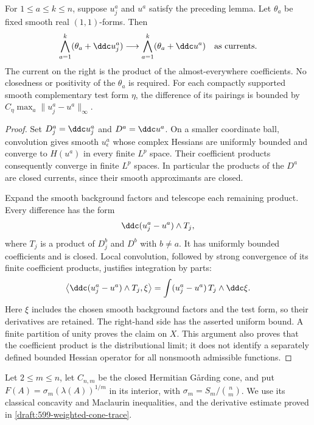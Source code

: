 \begin{lemma}\label{draft:603-complex-hessian-products}
For $1\leq a\leq k\leq n$, suppose $u_j^a$ and $u^a$ satisfy the preceding
lemma. Let $\theta_a$ be fixed smooth real $(1,1)$-forms. Then
\[
 \bigwedge_{a=1}^k(\theta_a+\ddc u_j^a)
       \longrightarrow
 \bigwedge_{a=1}^k(\theta_a+\ddc u^a)
       \quad\hbox{as currents}.
\]
The current on the right is the product of the almost-everywhere
coefficients. No closedness or positivity of the $\theta_a$ is required.
For each compactly supported smooth complementary test form $\eta$, the
difference of its pairings is bounded by
$C_\eta\max_a\|u_j^a-u^a\|_\infty$.
\end{lemma}
\begin{proof}
Set $D_j^a=\ddc u_j^a$ and $D^a=\ddc u^a$.
On a smaller coordinate ball, convolution gives smooth $u_\epsilon^a$
whose complex Hessians are uniformly bounded and converge to $H(u^a)$
in every finite $L^p$ space. Their coefficient products consequently
converge in finite $L^p$ spaces. In particular the products of the $D^a$
are closed currents, since their smooth approximants are closed.

Expand the smooth background factors and telescope each remaining
product. Every difference has the form
\[
 \ddc(u_j^a-u^a)\wedge T_j,
\]
where $T_j$ is a product of $D_j^b$ and $D^b$ with $b\ne a$.
It has uniformly bounded coefficients and is closed.
Local convolution, followed by strong convergence of its finite
coefficient products, justifies integration by parts:
\[
 \left\langle\ddc(u_j^a-u^a)\wedge T_j,\xi\right\rangle
       =\int (u_j^a-u^a)\,T_j\wedge\ddc\xi.
\]
Here $\xi$ includes the chosen smooth background factors and the test
form, so their derivatives are retained. The right-hand side has the
asserted uniform bound. A finite partition of unity proves the claim on
$X$. This argument also proves that the coefficient product is the
distributional limit; it does not identify a separately defined bounded
Hessian operator for all nonsmooth admissible functions.
\end{proof}

Let $2\leq m\leq n$, let $C_{n,m}$ be the closed Hermitian G\aa rding cone,
and put $F(A)=\sigma_m(\lambda(A))^{1/m}$ in its interior, with
$\sigma_m=S_m/\binom nm$. We use its classical concavity and Maclaurin
inequalities, and the derivative estimate proved in
\cref{draft:599-weighted-cone-trace}.

